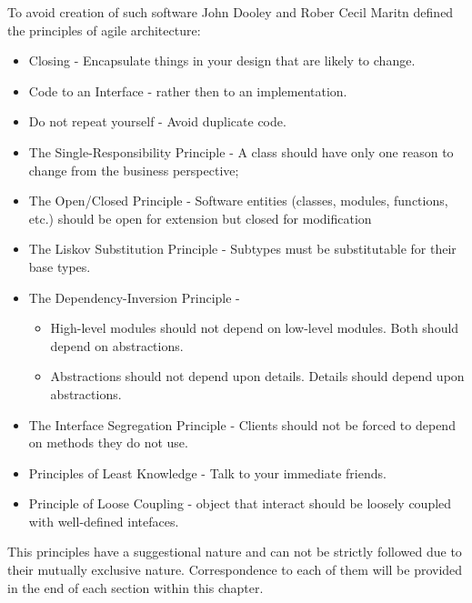 To avoid creation of such software John Dooley \cite{Dooley} and Rober Cecil Maritn \cite{MartinASD} defined  the principles of agile architecture:
\begin{itemize}
	\item Closing - Encapsulate things in your design that are likely to change.
	\item Code to an Interface - rather then to an implementation. 
	\item Do not repeat yourself - Avoid duplicate code.
	\item The Single-Responsibility Principle - A class should have only one reason to change from the business perspective;
	\item The Open/Closed Principle - Software entities (classes, modules, functions, etc.) should be open for extension but closed for modification
	\item The Liskov Substitution Principle - Subtypes must be substitutable for their base types.
	\item The Dependency-Inversion Principle - 		
	\begin{itemize}
		\item High-level modules should not depend on low-level modules.  Both should depend on abstractions. 
		\item Abstractions should not depend upon details. Details should depend upon abstractions.
	\end{itemize}
	\item The Interface Segregation Principle - Clients should not be forced to depend on methods they do not use.
	\item Principles of Least Knowledge - Talk to your immediate friends. 
	\item Principle of Loose Coupling - object that interact should be loosely coupled with well-defined intefaces.
\end{itemize}

This principles have a suggestional nature and can not be strictly followed due to their mutually exclusive nature. Correspondence to each of them will be provided in the end of each section within this chapter.

